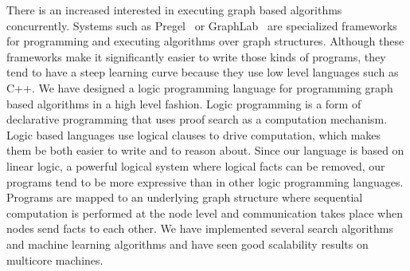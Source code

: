 There is an increased interested in executing graph based algorithms concurrently.
Systems such as Pregel~\cite{Malewicz:2010:PSL:1807167.1807184} or GraphLab~\cite{GraphLab2010}
are specialized frameworks for programming and
executing algorithms over graph structures. Although these frameworks make it significantly easier to write
those kinds of programs, they tend to have a steep learning curve because they use low level languages
such as C++. We have designed a logic programming language for programming graph based algorithms
in a high level fashion. 
Logic programming is a form of declarative programming that uses proof search as a computation
mechanism. Logic based languages use logical clauses to drive computation, which makes them
be both easier to write and to reason about.
Since our language is based on linear logic, a powerful logical system where logical facts can be removed,
our programs tend to be more expressive than in other logic programming languages.
Programs are mapped to an underlying graph structure where sequential computation is performed at the node level
and communication takes place when nodes send facts to each other.
We have implemented several search algorithms and machine
learning algorithms and have seen good scalability results on multicore machines.
